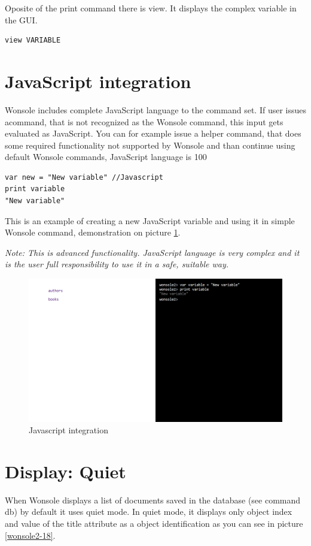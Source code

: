 \documentclass[10pt,a4paper,oneside]{report}
\begin{document}
Oposite of the print command there is view. It displays the complex variable in
the GUI.
\begin{verbatim}
view VARIABLE
\end{verbatim}

\section{JavaScript integration}
Wonsole includes complete JavaScript language to the command set. If user issues
acommand, that is not recognized as the Wonsole command, this input gets
evaluated as JavaScript. You can for example issue a helper command, that does
some required functionality not supported by Wonsole and than continue using
default Wonsole commands, JavaScript language is 100%

\begin{verbatim}
var new = "New variable" //Javascript
print variable
"New variable"
\end{verbatim}

This is an example of creating a new JavaScript variable and using it in simple
Wonsole command, demonstration on picture \ref{wonsole2-15}.

\textit{Note: This is advanced functionality. JavaScript language is very
complex and it is the user full responsibility to use it in a safe, suitable
way.}
 

\begin{figure}
\centering
\includegraphics[width=\textwidth]{screenshot/wonsole2/wonsole2-15.png}
\caption{Javascript integration}
\label{wonsole2-15}
\end{figure}

\section{Display: Quiet}
When Wonsole displays a list of documents saved in the database (see command
db) by default it uses quiet mode. In quiet mode, it displays only object index and
value of the title attribute as a object identification as you can see in
picture \ref{wonsole2-18}.
\end{document}
